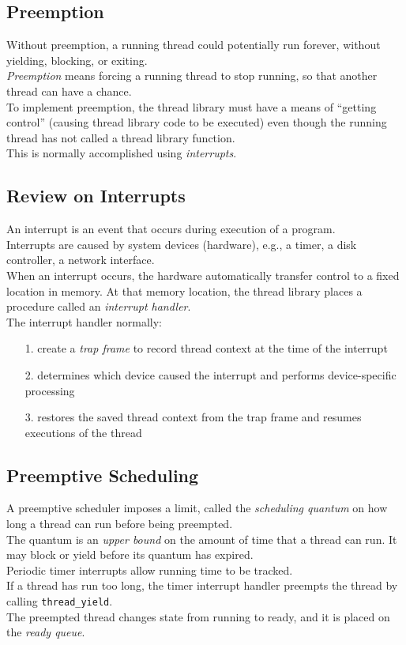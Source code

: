 \documentclass[12pt]{article}
\theoremstyle{plain}
\theoremstyle{definition}
\begin{document}
\subsection{Preemption}
Without preemption, a running thread could potentially run forever, without yielding, blocking, or exiting. \\
\emph{Preemption} means forcing a running thread to stop running, so that another thread can have a chance. \\
To implement preemption, the thread library must have a means of ``getting control'' (causing thread library code to be executed) even though the running thread has not called a thread library function. \\
This is normally accomplished using \emph{interrupts}.

\subsection{Review on Interrupts}
An interrupt is an event that occurs during execution of a program. \\
Interrupts are caused by system devices (hardware), e.g., a timer, a disk controller, a network interface. \\
When an interrupt occurs, the hardware automatically transfer control to a fixed location in memory.
At that memory location, the thread library places a procedure called an \emph{interrupt handler}. \\
The interrupt handler normally:
\begin{enumerate}
  \item[1.] create a \emph{trap frame} to record thread context at the time of the interrupt
  \item[2.] determines which device caused the interrupt and performs device-specific processing
  \item[3.] restores the saved thread context from the trap frame and resumes executions of the thread
\end{enumerate}

\subsection{Preemptive Scheduling}
A preemptive scheduler imposes a limit, called the \emph{scheduling quantum} on how long a thread can run before being preempted. \\
The quantum is an \emph{upper bound} on the amount of time that a thread can run.
It may block or yield before its quantum has expired. \\
Periodic timer interrupts allow running time to be tracked. \\
If a thread has run too long, the timer interrupt handler preempts the thread by calling \texttt{thread\_yield}. \\
The preempted thread changes state from running to ready, and it is placed on the \emph{ready queue}. \\
\end{document}
